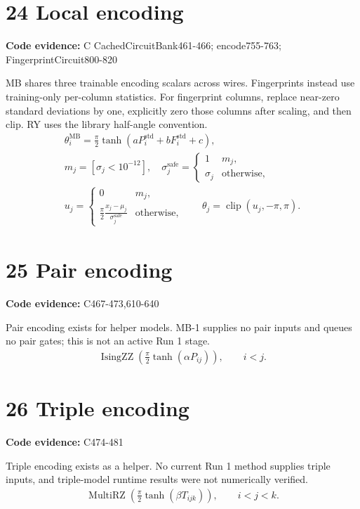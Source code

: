 \documentclass[10pt,a4paper]{article}
\newcommand{\stage}[2]{\section*{#1}\textbf{Code evidence:} #2\par}
\begin{document}
\par\noindent\begin{minipage}{\linewidth}
\stage{24 Local encoding}{C CachedCircuitBank461-466; encode755-763; FingerprintCircuit800-820}
MB shares three trainable encoding scalars across wires. Fingerprints instead use training-only per-column statistics. For fingerprint columns, replace near-zero standard deviations by one, explicitly zero those columns after scaling, and then clip. RY uses the library half-angle convention.
\[
\begin{gathered}
\theta_i^{\mathrm{MB}}=\frac\pi2\tanh(aP_i^{\mathrm{std}}+bF_i^{\mathrm{std}}+c),\\ m_j=[\sigma_j<10^{-12}],\quad \sigma_j^{\mathrm{safe}}=\begin{cases}1&m_j,\\\sigma_j&\text{otherwise},\end{cases}\\ u_j=\begin{cases}0&m_j,\\\frac\pi2\frac{x_j-\mu_j}{\sigma_j^{\mathrm{safe}}}&\text{otherwise},\end{cases}\qquad \theta_j=\operatorname{clip}(u_j,-\pi,\pi).
\end{gathered}
\]
\end{minipage}\par\vspace{4pt}
\par\noindent\begin{minipage}{\linewidth}
\stage{25 Pair encoding}{C467-473,610-640}
Pair encoding exists for helper models. MB-1 supplies no pair inputs and queues no pair gates; this is not an active Run 1 stage.
\[
\begin{gathered}
\operatorname{IsingZZ}\!\left(\frac\pi2\tanh(\alpha P_{ij})\right),\qquad i<j.
\end{gathered}
\]
\end{minipage}\par\vspace{4pt}
\par\noindent\begin{minipage}{\linewidth}
\stage{26 Triple encoding}{C474-481}
Triple encoding exists as a helper. No current Run 1 method supplies triple inputs, and triple-model runtime results were not numerically verified.
\[
\begin{gathered}
\operatorname{MultiRZ}\!\left(\frac\pi2\tanh(\beta T_{ijk})\right),\qquad i<j<k.
\end{gathered}
\]
\end{minipage}\par\vspace{4pt}
\end{document}
